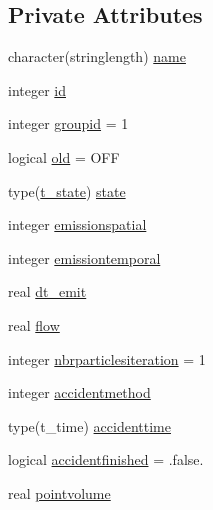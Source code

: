 \subsection*{Private Attributes}
\begin{DoxyCompactItemize}
\item 
character(stringlength) \mbox{\hyperlink{structmodulelagrangian_1_1t__origin_a29c5e4d4827a1864ed82b3d37550a0b0}{name}}
\item 
integer \mbox{\hyperlink{structmodulelagrangian_1_1t__origin_a68e5f924ef208b89e2e3b6b55c1e7621}{id}}
\item 
integer \mbox{\hyperlink{structmodulelagrangian_1_1t__origin_af351f202c8181c5fd3089e41e8abc7cb}{groupid}} = 1
\item 
logical \mbox{\hyperlink{structmodulelagrangian_1_1t__origin_a5587bfef9b9eb29f55ba3da6914a54c8}{old}} = O\+FF
\item 
type(\mbox{\hyperlink{structmodulelagrangian_1_1t__state}{t\+\_\+state}}) \mbox{\hyperlink{structmodulelagrangian_1_1t__origin_a5a2363709c7ce800d3ed4074db41ea16}{state}}
\item 
integer \mbox{\hyperlink{structmodulelagrangian_1_1t__origin_ae029bd444d01c05b353100cf4b93996c}{emissionspatial}}
\item 
integer \mbox{\hyperlink{structmodulelagrangian_1_1t__origin_a1161a05063904f2bac852bfb81e81354}{emissiontemporal}}
\item 
real \mbox{\hyperlink{structmodulelagrangian_1_1t__origin_aa4b64b283a841356608d6502ca1c9193}{dt\+\_\+emit}}
\item 
real \mbox{\hyperlink{structmodulelagrangian_1_1t__origin_a90b0f84bed5be732e288ec96e48a4552}{flow}}
\item 
integer \mbox{\hyperlink{structmodulelagrangian_1_1t__origin_a2450c00b680d4057be6a648797c8df29}{nbrparticlesiteration}} = 1
\item 
integer \mbox{\hyperlink{structmodulelagrangian_1_1t__origin_a1c55d44423a47672f41f82221bccca1f}{accidentmethod}}
\item 
type(t\+\_\+time) \mbox{\hyperlink{structmodulelagrangian_1_1t__origin_a249a4ff38a944d9e807e910cf0a03ece}{accidenttime}}
\item 
logical \mbox{\hyperlink{structmodulelagrangian_1_1t__origin_ac58aa8b4e149a168761bd82795fe2db6}{accidentfinished}} = .false.
\item 
real \mbox{\hyperlink{structmodulelagrangian_1_1t__origin_a8a73ca90f400f876647f9a5f4318136d}{pointvolume}}
\item 

\end{DoxyCompactItemize}
